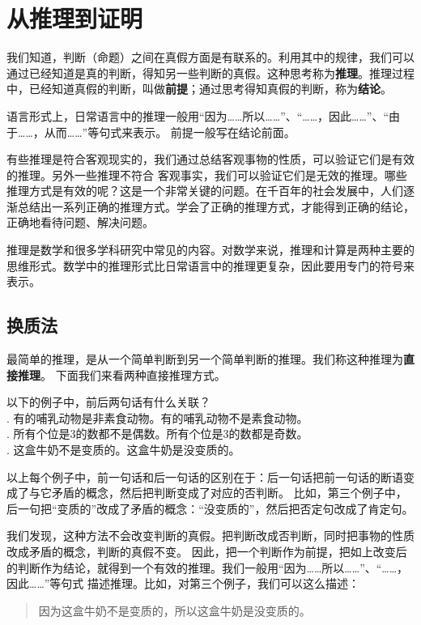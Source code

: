 \documentclass[12pt,UTF8]{ctexbook}
\begin{document}
\chapter{从推理到证明}

我们知道，判断（命题）之间在真假方面是有联系的。利用其中的规律，我们可以通过已经知道是真的判断，得知另一些判断的真假。这种思考称为\textbf{推理}。推理过程中，已经知道真假的判断，叫做\textbf{前提}；通过思考得知真假的判断，称为\textbf{结论}。

语言形式上，日常语言中的推理一般用“因为……所以……”、“……，因此……”、“由于……，从而……”等句式来表示。
前提一般写在结论前面。

有些推理是符合客观现实的，我们通过总结客观事物的性质，可以验证它们是有效的推理。另外一些推理不符合
客观事实，我们可以验证它们是无效的推理。哪些推理方式是有效的呢？这是一个非常关键的问题。在千百年的社会发展中，人们逐渐总结出一系列正确的推理方式。学会了正确的推理方式，才能得到正确的结论，正确地看待问题、解决问题。

推理是数学和很多学科研究中常见的内容。对数学来说，推理和计算是两种主要的思维形式。数学中的推理形式比日常语言中的推理更复杂，因此要用专门的符号来表示。

\section{换质法}

最简单的推理，是从一个简单判断到另一个简单判断的推理。我们称这种推理为\textbf{直接推理}。
下面我们来看两种直接推理方式。

\begin{et}\label{et:2b-0-0} 
    以下的例子中，前后两句话有什么关联？\\
    . 有的哺乳动物是非素食动物。有的哺乳动物不是素食动物。\\
    . 所有个位是$3$的数都不是偶数。所有个位是$3$的数都是奇数。\\
    . 这盒牛奶不是变质的。这盒牛奶是没变质的。
\end{et}
以上每个例子中，前一句话和后一句话的区别在于：后一句话把前一句话的断语变成了与它矛盾的概念，然后把判断变成了对应的否判断。
比如，第三个例子中，后一句把“变质的”改成了矛盾的概念：“没变质的”，然后把否定句改成了肯定句。

我们发现，这种方法不会改变判断的真假。把判断改成否判断，同时把事物的性质改成矛盾的概念，判断的真假不变。
因此，把一个判断作为前提，把如上改变后的判断作为结论，就得到一个有效的推理。我们一般用“因为……所以……”、“……，因此……”等句式
描述推理。比如，对第三个例子，我们可以这么描述：
\begin{quotation}
    因为这盒牛奶不是变质的，所以这盒牛奶是没变质的。
\end{quotation}
\end{document}
